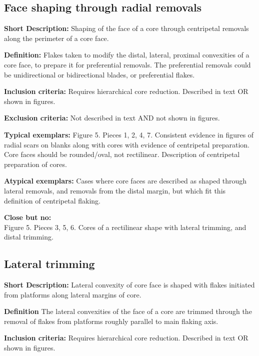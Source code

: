 \documentclass[
]{article}
\begin{document}
\hypertarget{face-shaping-through-radial-removals}{%
\subsection{Face shaping through radial
removals}\label{face-shaping-through-radial-removals}}

\textbf{Short Description:} Shaping of the face of a core through
centripetal removals along the perimeter of a core face.

\textbf{Definition:} Flakes taken to modify the distal, lateral,
proximal convexities of a core face, to prepare it for preferential
removals. The preferential removals could be unidirectional or
bidirectional blades, or preferential flakes.

\textbf{Inclusion criteria:} Requires hierarchical core reduction.
Described in text OR shown in figures.

\textbf{Exclusion criteria:} Not described in text AND not shown in
figures.

\textbf{Typical exemplars:} Figure 5. Pieces 1, 2, 4, 7. Consistent
evidence in figures of radial scars on blanks along with cores with
evidence of centripetal preparation. Core faces should be rounded/oval,
not rectilinear. Description of centripetal preparation of cores.

\textbf{Atypical exemplars:} Cases where core faces are described as
shaped through lateral removals, and removals from the distal margin,
but which fit this definition of centripetal flaking.

\textbf{Close but no:}\\
Figure 5. Pieces 3, 5, 6. Cores of a rectilinear shape with lateral
trimming, and distal trimming.

\hypertarget{lateral-trimming}{%
\subsection{Lateral trimming}\label{lateral-trimming}}

\textbf{Short Description:} Lateral convexity of core face is shaped
with flakes initiated from platforms along lateral margins of core.

\textbf{Definition} The lateral convexities of the face of a core are
trimmed through the removal of flakes from platforms roughly parallel to
main flaking axis.

\textbf{Inclusion criteria:} Requires hierarchical core reduction.
Described in text OR shown in figures.
\end{document}
